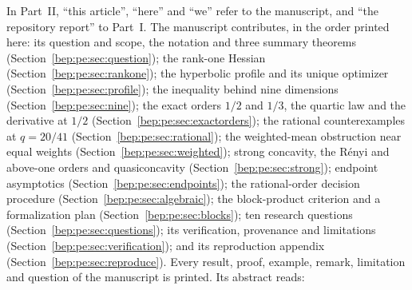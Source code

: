 \documentclass[11pt]{article}
\numberwithin{equation}{section}
\theoremstyle{definition}
\theoremstyle{remark}
\begin{document}
In Part~II, ``this article'', ``here'' and ``we'' refer to the
manuscript, and ``the repository report'' to Part~I. The manuscript
contributes, in the order printed here: its question and scope, the
notation and three summary theorems (Section~\ref{bep:pe:sec:question});
the rank-one Hessian (Section~\ref{bep:pe:sec:rankone}); the hyperbolic
profile and its unique optimizer (Section~\ref{bep:pe:sec:profile}); the
inequality behind nine dimensions (Section~\ref{bep:pe:sec:nine}); the
exact orders $1/2$ and $1/3$, the quartic law and the derivative at $1/2$
(Section~\ref{bep:pe:sec:exactorders}); the rational counterexamples at
$q=20/41$ (Section~\ref{bep:pe:sec:rational}); the weighted-mean
obstruction near equal weights (Section~\ref{bep:pe:sec:weighted});
strong concavity, the R\'enyi and above-one orders and quasiconcavity
(Section~\ref{bep:pe:sec:strong}); endpoint asymptotics
(Section~\ref{bep:pe:sec:endpoints}); the rational-order decision
procedure (Section~\ref{bep:pe:sec:algebraic}); the block-product
criterion and a formalization plan (Section~\ref{bep:pe:sec:blocks}); ten
research questions (Section~\ref{bep:pe:sec:questions}); its verification,
provenance and limitations (Section~\ref{bep:pe:sec:verification}); and
its reproduction appendix (Section~\ref{bep:pe:sec:reproduce}). Every
result, proof, example, remark, limitation and question of the manuscript
is printed. Its abstract reads:
\end{document}
